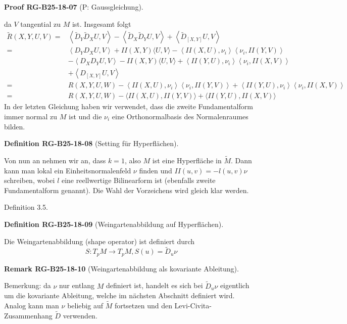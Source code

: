 \documentclass[10pt, letterpaper]{article}
\newcommand{\CustomHeading}[3]{%
  \par\medskip\noindent%
  \textbf{#1 #2} \textnormal{(#3)}.\enskip%
}
\newenvironment{DEF}[2]{\begin{unitbox}\CustomHeading{Definition}{#1}{#2}}{\end{unitbox}}
\newenvironment{REM}[2]{\begin{unitbox}\CustomHeading{Remark}{#1}{#2}}{\end{unitbox}}
\newenvironment{PROOF}[2]{\begin{unitbox}\CustomHeading{Proof}{#1}{#2}}{\end{unitbox}}
\begin{document}
\begin{PROOF}{RG-B25-18-07}{P: Gaussgleichung}
$$$$
da $V$ tangential zu $M$ ist. Insgesamt folgt
$$
\begin{aligned}
\tilde{R}(X, Y, U, V)= & \left\langle\tilde{D}_{Y} \tilde{D}_{X} U, V\right\rangle-\left\langle\tilde{D}_{X} \tilde{D}_{Y} U, V\right\rangle+\left\langle\tilde{D}_{[X, Y]} U, V\right\rangle \\
= & \left\langle D_{Y} D_{X} U, V\right\rangle+I I(X, Y)\langle U, V\rangle-\left\langle I I(X, U), \nu_{i}\right\rangle\left\langle\nu_{i}, I I(Y, V)\right\rangle \\
& -\left\langle D_{X} D_{Y} U, V\right\rangle-I I(X, Y)\langle U, V\rangle+\left\langle I I(Y, U), \nu_{i}\right\rangle\left\langle\nu_{i}, I I(X, V)\right\rangle \\
& +\left\langle D_{[X, Y]} U, V\right\rangle \\
= & R(X, Y, U, W)-\left\langle I I(X, U), \nu_{i}\right\rangle\left\langle\nu_{i}, I I(Y, V)\right\rangle+\left\langle I I(Y, U), \nu_{i}\right\rangle\left\langle\nu_{i}, I I(X, V)\right\rangle \\
= & R(X, Y, U, W)-\langle I I(X, U), I I(Y, V)\rangle+\langle I I(Y, U), I I(X, V)\rangle
\end{aligned}
$$
In der letzten Gleichung haben wir verwendet, dass die zweite Fundamentalform immer normal zu $M$ ist und die $\nu_{i}$ eine Orthonormalbasis des Normalenraumes bilden.
\end{PROOF}



\begin{DEF}{RG-B25-18-08}{Setting für Hyperflächen}
Von nun an nehmen wir an, dass $k=1$, also $M$ ist eine Hyperfläche in $\tilde{M}$. Dann kann man lokal ein Einheitsnormalenfeld $\nu$ finden und $I I(u, v)=-l(u, v) \nu$ schreiben, wobei $l$ eine reellwertige Bilinearform ist (ebenfalls zweite Fundamentalform genannt). Die Wahl der Vorzeichens wird gleich klar werden.
\end{DEF}

Definition 3.5. 


\begin{DEF}{RG-B25-18-09}{Weingartenabbildung auf Hyperflächen}
Die Weingartenabbildung (shape operator) ist definiert durch
$$
S: T_{p} M \rightarrow T_{p} M, S(u)=\tilde{D}_{u} \nu
$$
\end{DEF}

\begin{REM}{RG-B25-18-10}{Weingartenabbildung als kovariante Ableitung}
Bemerkung: da $\nu$ nur entlang $M$ definiert ist, handelt es sich bei $\tilde{D}_{u} \nu$ eigentlich um die kovariante Ableitung, welche im nächsten Abschnitt definiert wird. Analog kann man $\nu$ beliebig auf $\tilde{M}$ fortsetzen und den Levi-Civita-Zusammenhang $\tilde{D}$ verwenden.
\end{REM}
\end{document}
